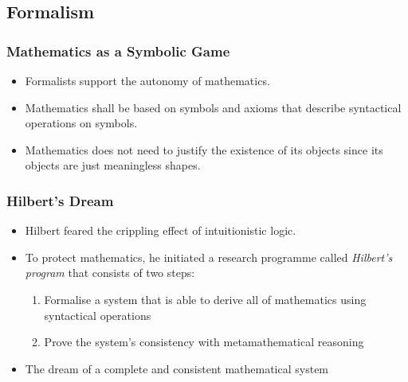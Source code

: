 \documentclass{beamer}
\begin{document}
\subsection{Formalism}
\begin{frame}
    \frametitle{Mathematics as a Symbolic Game}
    \begin{itemize}[<+->]
	\item Formalists support the autonomy of mathematics.
	\item Mathematics shall be based on symbols and axioms that describe syntactical operations on symbols.
	\item Mathematics does not need to justify the existence of its objects since its objects are just meaningless shapes.
    \end{itemize}
\end{frame}
\begin{frame}
    \frametitle{Hilbert's Dream}
    \begin{itemize}[<+->]
	\item Hilbert feared the crippling effect of intuitionistic logic.
	\item To protect mathematics, he initiated a research programme called \textit{Hilbert's program} that consists of two steps:
	\begin{enumerate}
		\item Formalise a system that is able to derive all of mathematics using syntactical operations
		\item Prove the system's consistency with metamathematical reasoning
	\end{enumerate}
	\item The dream of a complete and consistent mathematical system
    \end{itemize}
\end{frame}
\end{document}
